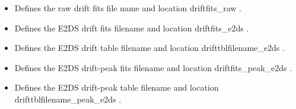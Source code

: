 \begin{itemize}
	\item {} 
	{Defines the raw drift fits file name and location}
	{driftfits\_raw}
	{\calDRIFTRAW}{\spirouConst.}{\calDRIFTRAW}
\end{itemize}

\begin{itemize}
	\item {} 
	{Defines the E2DS drift fits filename and location}
	{driftfits\_e2ds}
	{\calDRIFTE}{\spirouConst.}{\calDRIFTE}
\end{itemize}


\begin{itemize}
	\item {} 
	{Defines the E2DS drift table filename and location}
	{drifttblfilename\_e2ds}
	{\calDRIFTE}{\spirouConst.}{\calDRIFTE}
\end{itemize}


\begin{itemize}
	\item {} 
	{Defines the E2DS drift-peak fits filename and location}
	{driftfits\_peak\_e2ds}
	{\calDRIFTPEAK}{\spirouConst.}{\calDRIFTPEAK}
\end{itemize}


\begin{itemize}
	\item {} 
	{Defines the E2DS drift-peak table filename and location}
	{drifttblfilename\_peak\_e2ds}
	{\calDRIFTPEAK}{\spirouConst.}{\calDRIFTPEAK}
\end{itemize}





